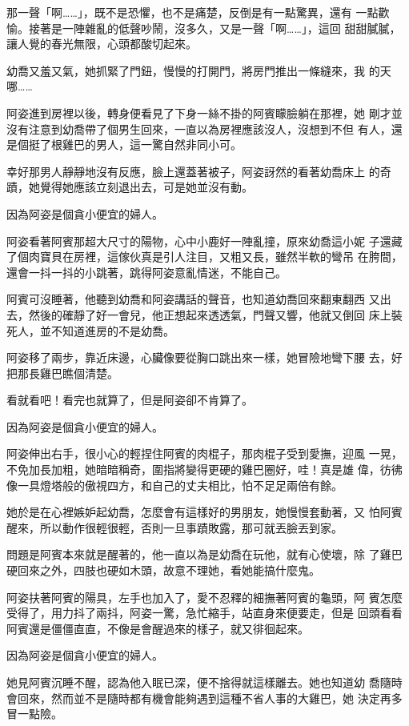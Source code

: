 那一聲「啊……」，既不是恐懼，也不是痛楚，反倒是有一點驚異，還有
一點歡愉。接著是一陣雜亂的低聲吵鬧，沒多久，又是一聲「啊……」，這回
甜甜膩膩，讓人覺的春光無限，心頭都酸切起來。

幼喬又羞又氣，她抓緊了門鈕，慢慢的打開門，將房門推出一條縫來，我
的天哪……

阿姿進到房裡以後，轉身便看見了下身一絲不掛的阿賓矇臉躺在那裡，她
剛才並沒有注意到幼喬帶了個男生回來，一直以為房裡應該沒人，沒想到不但
有人，還是個挺了根雞巴的男人，這一驚自然非同小可。

幸好那男人靜靜地沒有反應，臉上還蓋著被子，阿姿訝然的看著幼喬床上
的奇蹟，她覺得她應該立刻退出去，可是她並沒有動。

因為阿姿是個貪小便宜的婦人。

阿姿看著阿賓那超大尺寸的陽物，心中小鹿好一陣亂撞，原來幼喬這小妮
子還藏了個肉寶貝在房裡，這傢伙真是引人注目，又粗又長，雖然半軟的彎吊
在胯間，還會一抖一抖的小跳著，跳得阿姿意亂情迷，不能自己。

阿賓可沒睡著，他聽到幼喬和阿姿講話的聲音，也知道幼喬回來翻東翻西
又出去，然後的確靜了好一會兒，他正想起來透透氣，門聲又響，他就又倒回
床上裝死人，並不知道進房的不是幼喬。

阿姿移了兩步，靠近床邊，心臟像要從胸口跳出來一樣，她冒險地彎下腰
去，好把那長雞巴瞧個清楚。

看就看吧！看完也就算了，但是阿姿卻不肯算了。

因為阿姿是個貪小便宜的婦人。

阿姿伸出右手，很小心的輕捏住阿賓的肉棍子，那肉棍子受到愛撫，迎風
一晃，不免加長加粗，她暗暗稱奇，圍指將變得更硬的雞巴圈好，哇！真是雄
偉，彷彿像一具燈塔般的傲視四方，和自己的丈夫相比，怕不足足兩倍有餘。

她於是在心裡嫉妒起幼喬，怎麼會有這樣好的男朋友，她慢慢套動著，又
怕阿賓醒來，所以動作很輕很輕，否則一旦事蹟敗露，那可就丟臉丟到家。

問題是阿賓本來就是醒著的，他一直以為是幼喬在玩他，就有心使壞，除
了雞巴硬回來之外，四肢也硬如木頭，故意不理她，看她能搞什麼鬼。

阿姿扶著阿賓的陽具，左手也加入了，愛不忍釋的細撫著阿賓的龜頭，阿
賓怎麼受得了，用力抖了兩抖，阿姿一驚，急忙縮手，站直身來便要走，但是
回頭看看阿賓還是僵僵直直，不像是會醒過來的樣子，就又徘徊起來。

因為阿姿是個貪小便宜的婦人。

她見阿賓沉睡不醒，認為他入眠已深，便不捨得就這樣離去。她也知道幼
喬隨時會回來，然而並不是隨時都有機會能夠遇到這種不省人事的大雞巴，她
決定再多冒一點險。


